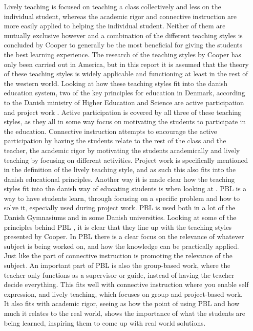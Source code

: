 \noindent
Lively teaching is focused on teaching a class collectively and less on the individual student, whereas the academic rigor and connective instruction are more easily applied to helping the individual student. Neither of them are mutually exclusive however and a combination of the different teaching styles is concluded by Cooper to generally be the most beneficial for giving the students the best learning experience.
\newline\newline
The research of the teaching styles by Cooper has only been carried out in America, but in this report it is assumed that the theory of these teaching styles is widely applicable and functioning at least in the rest of the western world. Looking at how these teaching styles fit into the danish education system, two of the key principles for education in Denmark, according to the Danish ministry of Higher Education and Science are active participation and project work \cite{MinistryofHigherEducationandScience2018PrinciplesForskningsministeriet}. Active participation is covered by all three of these teaching styles, as they all in some way focus on motivating the students to participate in the education. Connective instruction attempts to encourage the active participation by having the students relate to the rest of the class and the teacher, the academic rigor by motivating the students academically and lively teaching by focusing on different activities. Project work is specifically mentioned in the definition of the lively teaching style, and as such this also fits into the danish educational principles.
\newline\newline
Another way it is made clear how the teaching styles fit into the danish way of educating students is when looking at . PBL is a way to have students learn, through focusing on a specific problem and how to solve it, especially used during project work. PBL is used both in a lot of the Danish Gymnasiums and in some Danish universities. Looking at some of the principles behind PBL \cite{Holgaard2014PBL-ProblembaseretUddannelser}, it is clear that they line up with the teaching styles presented by Cooper. In PBL there is a clear focus on the relevance of whatever subject is being worked on, and how the knowledge can be practically applied. Just like the part of connective instruction is promoting the relevance of the subject. An important part of PBL is also the group-based work, where the teacher only functions as a supervisor or guide, instead of having the teacher decide everything. This fits well with connective instruction where you enable self expression, and lively teaching, which focuses on group and project-based work. It also fits with academic rigor, seeing as how the point of using PBL and how much it relates to the real world, shows the importance of what the students are being learned, inspiring them to come up with real world solutions. 
